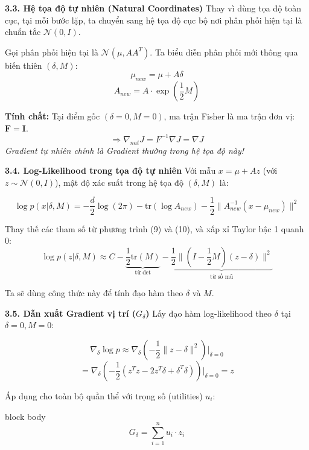 \documentclass[10pt,xcolor=dvipsnames]{beamer}
\begin{document}
\begin{frame}{\textbf{3.3. Hệ tọa độ tự nhiên (Natural Coordinates)}}
	Thay vì dùng tọa độ toàn cục, tại mỗi bước lặp, ta chuyển sang hệ tọa độ cục bộ nơi phân phối hiện tại là chuẩn tắc $\mathcal{N}(0, I)$.
	
	Gọi phân phối hiện tại là $\mathcal{N}(\mu, A A^T)$. Ta biểu diễn phân phối mới thông qua biến thiên $(\delta, M)$:
	\begin{equation}
		\mu_{new} = \mu + A \delta
	\end{equation}
	\begin{equation}
		A_{new} = A \cdot \exp\left(\frac{1}{2}M\right)
	\end{equation}
	
	\textbf{Tính chất:}
	Tại điểm gốc $(\delta=0, M=0)$, ma trận Fisher là ma trận đơn vị: $\mathbf{F = I}$.
	\[ \Rightarrow \nabla_{nat} J = F^{-1} \nabla J = \nabla J \]
	\textit{Gradient tự nhiên chính là Gradient thường trong hệ tọa độ này!}
\end{frame}

\begin{frame}{\textbf{3.4. Log-Likelihood trong tọa độ tự nhiên}}
	Với mẫu $x = \mu + A z$ (với $z \sim \mathcal{N}(0, I)$), mật độ xác suất trong hệ tọa độ $(\delta, M)$ là:
	
	\[ \log p(x | \delta, M) = -\frac{d}{2}\log(2\pi) - \text{tr}(\log A_{new}) - \frac{1}{2} \| A_{new}^{-1}(x	 - \mu_{new}) \|^2 \]
	
	Thay thế các tham số từ phương trình (9) và (10), và xấp xỉ Taylor bậc 1 quanh 0:
	\[ \log p(z | \delta, M) \approx C - \underbrace{\frac{1}{2}\text{tr}(M)}_{\text{từ } \det} - \underbrace{\frac{1}{2} \| (I - \frac{1}{2}M)(z - \delta) \|^2}_{\text{từ số mũ}} \]
	
	Ta sẽ dùng công thức này để tính đạo hàm theo $\delta$ và $M$.
\end{frame}

\begin{frame}{\textbf{3.5. Dẫn xuất Gradient vị trí ($G_\delta$)}}
	Lấy đạo hàm log-likelihood theo $\delta$ tại $\delta=0, M=0$:
	
	\[ \nabla_\delta \log p \approx \nabla_\delta \left( -\frac{1}{2} \|z - \delta\|^2 \right) \Big|_{\delta=0} \]
	\[ = \nabla_\delta \left( -\frac{1}{2} (z^T z - 2z^T \delta + \delta^T \delta) \right) \Big|_{\delta=0} = z \]
	
	Áp dụng cho toàn bộ quần thể với trọng số (utilities) $u_i$:
	\begin{beamercolorbox}[sep=8pt,center,shadow=true,rounded=true]{block body}
		\[ G_\delta = \sum_{i=1}^n u_i \cdot z_i \]
	\end{beamercolorbox}
\end{frame}
\end{document}
